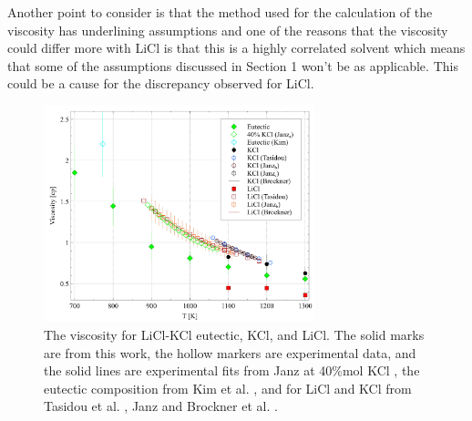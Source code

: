 \documentclass[review]{elsarticle}
\providecommand{\DIFaddtex}[1]{{\protect\color{blue} \sf #1}} %
\providecommand{\DIFaddbegin}{} %
\providecommand{\DIFaddend}{} %
\providecommand{\DIFdelend}{} %
\providecommand{\DIFadd}[1]{\texorpdfstring{\DIFaddtex{#1}}{#1}} %
\newcommand{\DIFaddincludegraphics}[2][]{{\color{blue}\fbox{\DIFOincludegraphics[#1]{#2}}}} %
\DeclareRobustCommand{\DIFaddbegin}{\DIFOaddbegin \let\includegraphics\DIFaddincludegraphics} %
\DeclareRobustCommand{\DIFaddend}{\DIFOaddend \let\includegraphics\DIFOincludegraphics} %
\DeclareRobustCommand{\DIFdelend}{\DIFOaddend \let\includegraphics\DIFOincludegraphics} %
\begin{document}
\DIFdelend \DIFaddbegin \DIFadd{Another point to consider is that the method used for the calculation of the viscosity has underlining assumptions and one of the reasons that the viscosity could differ more with LiCl is that this is a highly correlated solvent which means that some of the assumptions discussed in Section 1 won't be as applicable. This could be a cause for the discrepancy observed for LiCl.
}\DIFaddend \begin{figure}[h]
 \centering
 \includegraphics[width=0.7\textwidth]{visc_licl-kcl.jpg} 
 \caption{The viscosity for LiCl-KCl eutectic, KCl, and LiCl. The solid marks are from this work, the hollow markers are experimental data, and the solid lines are experimental fits from Janz at 40\%mol KCl \cite{janz_visc}, the eutectic composition from Kim et al. \cite{kim2012high}, and for LiCl and KCl from Tasidou et al. \cite{Tasidou}, Janz \cite{janz_nist,janz_osti} and Brockner et al. \cite{brockner1975high}.}
 \label{fig:LiCl-KCl visc}
\end{figure} 

\FloatBarrier
\end{document}
